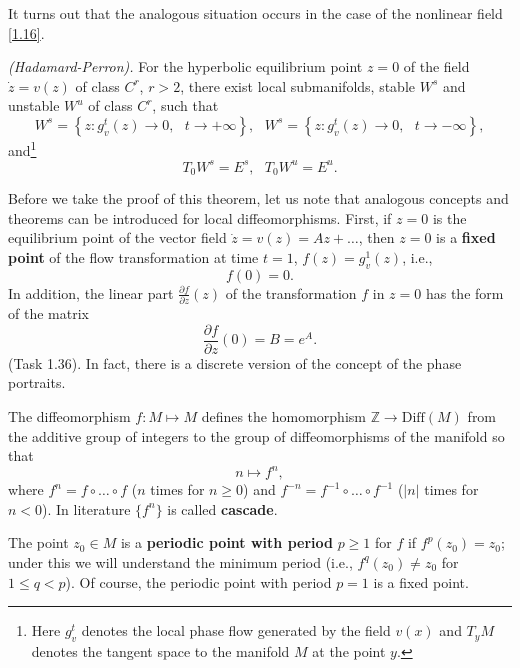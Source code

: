 It turns out that the analogous situation occurs in the case of the nonlinear field \eqref{1.16}.

\begin{theorem}\emph{(Hadamard-Perron).}\label{theo:1.18}
	For the hyperbolic equilibrium point $z = 0$ of the field $\dot{z} = v (z)$ of class $C^r$, $r> 2$, there exist local submanifolds, stable $W^s$ and unstable $W^u$ of class $C^r$, such that
	\begin{equation}
	\label{1.19}
	W^{s}=\left\{ z:g_{v}^{t}(z)\rightarrow 0,\text{ }t\rightarrow +\infty
	\right\} ,\text{ \ }W^{s}=\left\{ z:g_{v}^{t}(z)\rightarrow 0,\text{ }%
	t\rightarrow -\infty \right\} ,
	\end{equation}
	and\footnote{Here $g_v^t$ denotes the local phase flow generated by the field $v (x)$ and $T_y M$ denotes the tangent space to the manifold $M$ at the point $y$.}
	\begin{equation}
	\label{1.20}
	T_{0}W^{s}=E^{s},\text{ \ \ }T_{0}W^{u}=E^{u}.
	\end{equation}
\end{theorem}
Before we take the proof of this theorem, let us note that analogous concepts and theorems can be introduced for local diffeomorphisms. First, if $z = 0$ is the equilibrium point of the vector field $\dot{z}=v(z)=Az+\ldots$, then $z = 0$ is a \textbf{fixed point} of the flow transformation at time $t = 1$, $f (z) = g^1_v (z)$, i.e.,
$$
f(0)=0.
$$
In addition, the linear part $\frac{\partial f}{\partial z}(z)$ of the transformation $f$ in $z = 0$ has the form of the matrix
$$
\frac{\partial f}{\partial z}(0)=B=e^{A}.
$$
(Task 1.36). In fact, there is a discrete version of the concept of the phase portraits.

\begin{definition}
	The diffeomorphism $f:M\longmapsto M$ defines the homomorphism $\mathbb{Z}\rightarrow \textrm{Diff}(M)$ from the additive group of integers to the group of diffeomorphisms of the manifold so that
	$$
	n\longmapsto f^{n},
	$$
	where $f^{n}=f\circ \ldots \circ f$ ($n$ times for $n \geq 0$) and $f^{-n}=f^{-1}\circ \ldots \circ f^{-1}$ ($\left\vert n\right\vert $ times for $n <0$). In literature $\{f^n\}$ is called \textbf{cascade}.
	
	The point $z_0 \in M$ is a \textbf{periodic point with period} $p \geq 1$ for $f$ if $f^p (z_0) = z_0$; under this we will understand the minimum period (i.e., $f^q (z_0) \neq  z_0$ for $1 \leq q <p$).
	Of course, the periodic point with period $p = 1$ is a fixed point.
\end{definition}

